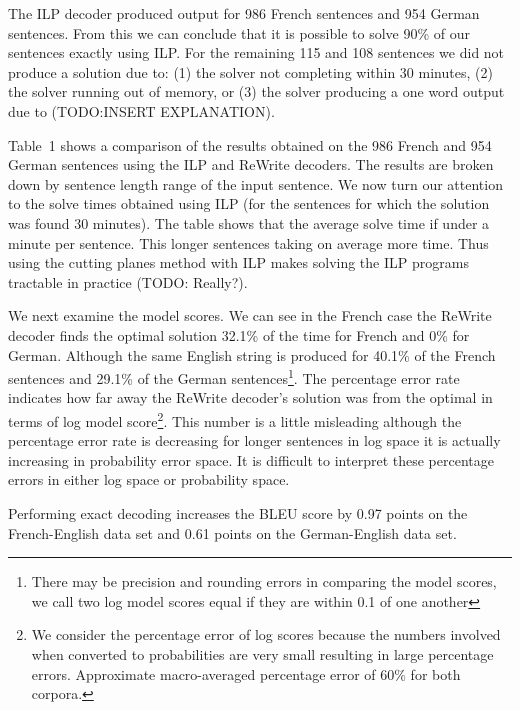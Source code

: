 The ILP decoder produced output for 986 French sentences and 954
German sentences.  From this we can conclude that it is possible to
solve 90\% of our sentences exactly using ILP.  For the remaining 115
and 108 sentences we did not produce a solution due to: (1) the solver
not completing within 30 minutes, (2) the solver running out of
memory, or (3) the solver producing a one word output due to
(TODO:INSERT EXPLANATION).

Table~1 shows a comparison of the results obtained on the 986 French
and 954 German sentences using the ILP and ReWrite decoders.  The
results are broken down by sentence length range of the input
sentence.  We now turn our attention to the solve times obtained using
ILP (for the sentences for which the solution was found 30 minutes).
The table shows that the average solve time if under a minute per
sentence.  This longer sentences taking on average more time.  Thus
using the cutting planes method with ILP makes solving the ILP
programs tractable in practice (TODO: Really?).

We next examine the model scores.  We can see in the French case the
ReWrite decoder finds the optimal solution 32.1\% of the time for
French and 0\% for German.  Although the same English string is
produced for 40.1\% of the French sentences and 29.1\% of the German
sentences\footnote{There may be precision and rounding errors in
  comparing the model scores, we call two log model scores equal if
  they are within 0.1 of one another}.  The percentage error rate
indicates how far away the ReWrite decoder's solution was from the
optimal in terms of log model score\footnote{We consider the
  percentage error of log scores because the numbers involved when
  converted to probabilities are very small resulting in large
  percentage errors.  Approximate macro-averaged percentage error of
  60\% for both corpora.}.  This number is a little misleading
although the percentage error rate is decreasing for longer sentences
in log space it is actually increasing in probability error space.  It
is difficult to interpret these percentage errors in either log space
or probability space.

Performing exact decoding increases the BLEU score by 0.97 points on
the French-English data set and 0.61 points on the German-English data
set.



